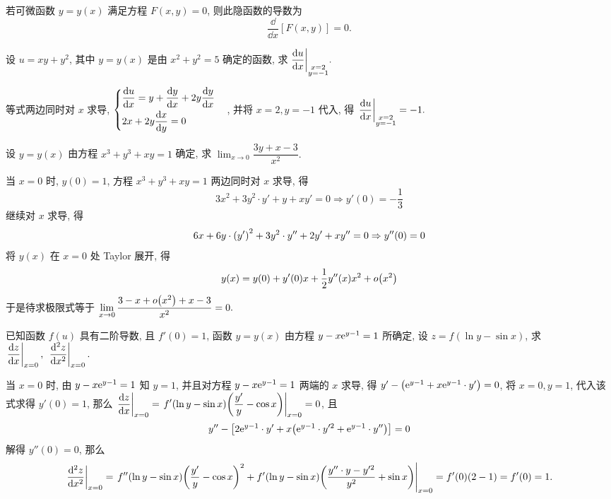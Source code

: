 \begin{theorem}[隐函数的导数]
    若可微函数 $y=y(x)$ 满足方程 $F(x,y)=0$, 则此隐函数的导数为
    $$\dfrac{\dd }{\dd x}[F(x,y)]=0.$$
\end{theorem}

\begin{example}
    设 $u=xy+y^2$, 其中 $y=y(x)$ 是由 $x^2+y^2=5$ 确定的函数, 求 $\displaystyle\dv{u}{x}\biggl |_{\substack{x=2\\y=-1}}.$
\end{example}
\begin{solution}
    等式两边同时对 $x$ 求导, $\begin{cases}
            \displaystyle \dv{u}{x}=y+\dv{y}{x}+2y\dv{y}{x} \\[6pt]
            \displaystyle 2x+2y\dv{x}{y} =0
        \end{cases}$, 并将 $x=2,y=-1$ 代入, 得 $\displaystyle\eval{\dv{u}{x}}_{\substack{x=2\\y=-1}}=-1.$
\end{solution}

\begin{example}
    设 $y=y(x)$ 由方程 $x^3+y^3+xy=1$ 确定, 求 $\displaystyle\lim_{x\to0}\dfrac{3y+x-3}{x^2}.$
\end{example}
\begin{solution}
    当 $x=0$ 时, $y(0)=1$,
    方程 $x^3+y^3+xy=1$ 两边同时对 $x$ 求导, 得 $$3x^2+3y^2\cdot y'+y+xy'=0\Rightarrow y'(0)=-\dfrac{1}{3}$$
    继续对 $x$ 求导, 得 $$6x+6y\cdot\qty(y')^2+3y^2\cdot y''+2y'+xy''=0\Rightarrow y''(0)=0$$
    将 $y(x)$ 在 $x=0$ 处 Taylor 展开, 得
    $$y(x)=y(0)+y'(0)x+\dfrac{1}{2}y''(x)x^2+o\qty(x^2)$$
    于是待求极限式等于 $\displaystyle\lim_{x\to0}\dfrac{3-x+o\qty(x^2)+x-3}{x^2}=0.$
\end{solution}

\begin{example}[2007 数二]
    已知函数 $f(u)$ 具有二阶导数, 且 $f'(0)=1$, 函数 $y=y(x)$ 由方程 $y-x\mathrm{e} ^{y-1}=1$ 所确定, 设 $z=f(\ln y-\sin x)$, 求 $\displaystyle \eval{\dv{z}{x}}_{x=0},~\eval{\dv[2]{z}{x}}_{x=0}.$
\end{example}
\begin{solution}
    当 $x=0$ 时, 由 $y-x\mathrm{e} ^{y-1}=1$ 知 $y=1$, 并且对方程 $y-x\mathrm{e} ^{y-1}=1$ 两端的 $x$ 求导, 得 $y'-\qty(\mathrm{e} ^{y-1}+x\mathrm{e} ^{y-1}\cdot y')=0$, 将 $x=0,y=1$, 代入该式求得 $y'(0)=1$, 那么
    $\displaystyle \eval{\dv{z}{x}}_{x=0}=\eval{f'(\ln y-\sin x)\qty(\dfrac{y'}{y}-\cos x)}_{x=0}=0$, 且 $$y''-\qty[2\mathrm{e} ^{y-1}\cdot y'+x\qty(\mathrm{e} ^{y-1}\cdot y'^2+\mathrm{e} ^{y-1}\cdot y'')]=0$$
    解得 $y''(0)=0$, 那么
    $$\eval{\dv[2]{z}{x}}_{x=0}=\eval{f''(\ln y-\sin x)\qty(\dfrac{y'}{y}-\cos x)^2+f'(\ln y-\sin x)\qty(\dfrac{y''\cdot y-y'^2}{y^2}+\sin x)}_{x=0}=f'(0)(2-1)=f'(0)=1.$$
\end{solution}

